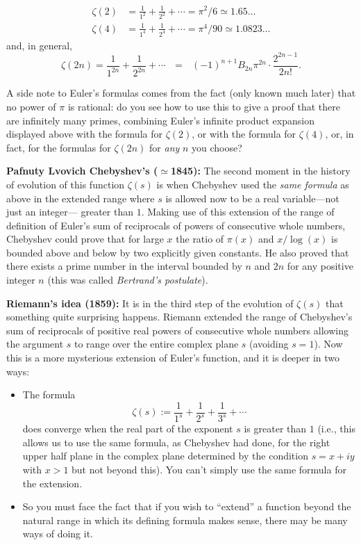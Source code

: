 \documentclass[openany]{book}
\theoremstyle{plain}
\theoremstyle{definition}
\begin{document}
{{{\begin{align*}
\zeta(2) &= {\frac{1}{1^2}}+{\frac{1}{2^2}}+\cdots = \pi^2/6 \simeq 1.65\dots\\
\zeta(4) &= {\frac{1}{1^4}}+{\frac{1}{2^4}}+\cdots = \pi^4/90\simeq 1.0823\dots
\end{align*}
and, in general,
  $$\zeta(2n) = {\frac{1}{1^{2n}}}+{\frac{1}{2^{2n}}}+\cdots \ \ \ = \ \ \ (-1)^{n+1}B_{2n}\pi^{2n}\cdot {\frac{2^{2n-1}}{2n!}}.$$

  A side note to Euler's formulas comes from the fact (only known much
  later) that no power of $\pi$ is rational: do you see how to use
  this to give a proof that there are infinitely many primes,
  combining Euler's infinite product expansion displayed above with
  the formula for $\zeta(2)$, or with the formula for $\zeta(4)$, or,
  in fact, for the formulas for $\zeta(2n)$ for {\it any} $n$ you
  choose?

  {\bf Pafnuty Lvovich Chebyshev's ($\simeq$1845):} The second moment
  in the history of evolution of this function $\zeta(s)$ is when
  Chebyshev used the {\it same formula} as above in the extended range
  where $s$ is allowed now to be a real variable---not just an
  integer--- greater than $1$.  Making use of this extension of the
  range of definition of Euler's sum of reciprocals of powers of
  consecutive whole numbers, Chebyshev could prove that for large $x$
  the ratio of $\pi(x)$ and $x/\log(x)$ is bounded above and below by
  two explicitly given constants. He also proved that there exists a
  prime number in the interval bounded by $n$ and $2n$ for any positive
  integer $n$ (this was called {\it Bertrand's postulate}).\vskip20pt

  {\bf Riemann's idea (1859):} It is in the third step of the
  evolution of $\zeta(s)$ that something quite surprising
  happens. Riemann extended the range of Chebyshev's sum of
  reciprocals of positive real powers of consecutive whole numbers
  allowing the argument $s$ to range over the entire complex plane $s$
  (avoiding $s=1$).  Now this is a more mysterious extension of
  Euler's function, and it is deeper in two ways:

\begin{itemize}
\item The formula $$\zeta(s):= {\frac{1}{1^s}}+ {\frac{1}{2^s}}+
  {\frac{1}{3^s}}+ \cdots$$ does converge when the real part of the
  exponent $s$ is greater than $1$ (i.e., this allows us to use the
  same formula, as Chebyshev had done, for the right upper half plane
  in the complex plane determined by the condition $s=x+iy$ with $x>1$
  but not beyond this).  You can't simply use the same formula for the
  extension.\item So you must face the fact that if you wish to
  ``extend'' a function beyond the natural range in which its defining
  formula makes sense, there may be many ways of doing it.
\end{itemize}

}}}
\end{document}
